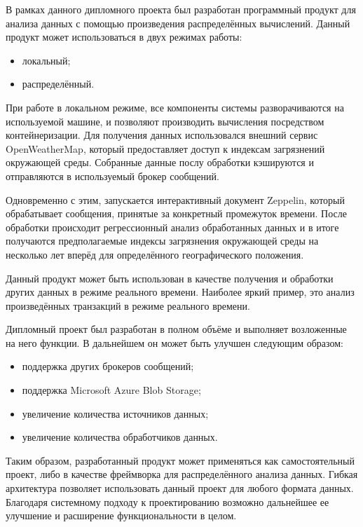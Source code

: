 \pagebreak
{}
\label{sec:outro}


В рамках данного дипломного проекта был разработан программный продукт для анализа данных с помощью произведения распределённых вычислений.
Данный продукт может использоваться в двух режимах работы:
\begin{itemize}
    \item локальный;
    \item распределённый.
\end{itemize}

При работе в локальном режиме, все компоненты системы разворачиваются на используемой машине, и позволяют производить вычисления посредством контейнеризации.
Для получения данных использовался внешний сервис OpenWeatherMap, который предоставляет доступ к индексам загрязнений окружающей среды.
Собранные данные послу обработки кэшируются и отправляются в используемый брокер сообщений.

Одновременно с этим, запускается интерактивный документ Zeppelin, который обрабатывает сообщения, принятые за конкретный промежуток времени.
После обработки происходит регрессионный анализ обработанных данных и в итоге получаются предполагаемые индексы загрязнения окружающей среды на несколько лет вперёд для определённого географического положения.

Данный продукт может быть использован в качестве получения и обработки других данных в режиме реального времени.
Наиболее яркий пример, это анализ произведённых транзакций в режиме реального времени.

Дипломный проект был разработан в полном объёме и выполняет возложенные на него функции.
В дальнейшем он может быть улучшен следующим образом:
\begin{itemize}
    \item поддержка других брокеров сообщений;
    \item поддержка Microsoft Azure Blob Storage;
    \item увеличение количества источников данных;
    \item увеличение количества обработчиков данных.
\end{itemize}

Таким образом, разработанный продукт может применяться как самостоятельный проект, либо в качестве фреймворка для распределённого анализа данных.
Гибкая архитектура позволяет использовать данный проект для любого формата данных.
Благодаря системному подходу к проектированию возможно дальнейшее ее улучшение и расширение функциональности в целом.
